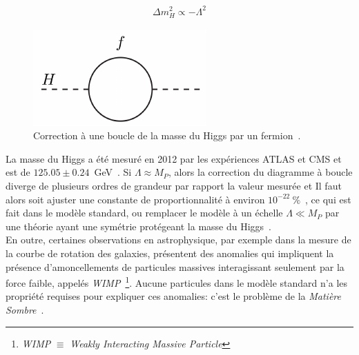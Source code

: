 \begin{eqnarray}
\label{eq:higgs_fermion_corr}
\Delta m_H^2 \propto -\Lambda^2
\end{eqnarray}

\begin{figure}
  \centering
  \includegraphics{higgs-loop.pdf}
  \caption{Correction à une boucle de la masse du Higgs par un
    fermion~\cite{martin_supersymmetry_1997}.}
  \label{fig:hloop}
\end{figure}

La masse du Higgs a été mesuré en 2012 par les expériences ATLAS et
CMS et est de
$125.05 \pm 0.24$~GeV~\cite{atlas_collaboration_combined_2015}. Si
$\Lambda \approx M_P$, alors la correction du diagramme à boucle
diverge de plusieurs ordres de grandeur par rapport la valeur mesurée
et Il faut alors soit ajuster une constante de proportionnalité à
environ $10^{-22}~\%$~\cite{giudice_naturally_20087}, ce qui est fait
dans le modèle standard, ou remplacer le modèle à un échelle
$\Lambda \ll M_P$ par une théorie ayant une symétrie protégeant la
masse du
Higgs~\cite{martin_supersymmetry_1997}. \\

En outre, certaines observations en astrophysique, par exemple dans la
mesure de la courbe de rotation des galaxies, présentent des anomalies
qui impliquent la présence d'amoncellements de particules massives
interagissant seulement par la force faible, appelés
\emph{WIMP}~\footnote{\emph{WIMP} $\equiv$ \emph{Weakly Interacting
    Massive Particle}}. Aucune particules dans le modèle standard n'a les propriété
requises pour expliquer ces anomalies: c'est le problème de la
\emph{Matière Sombre}~\cite{bertone_particle_2005}. \\

